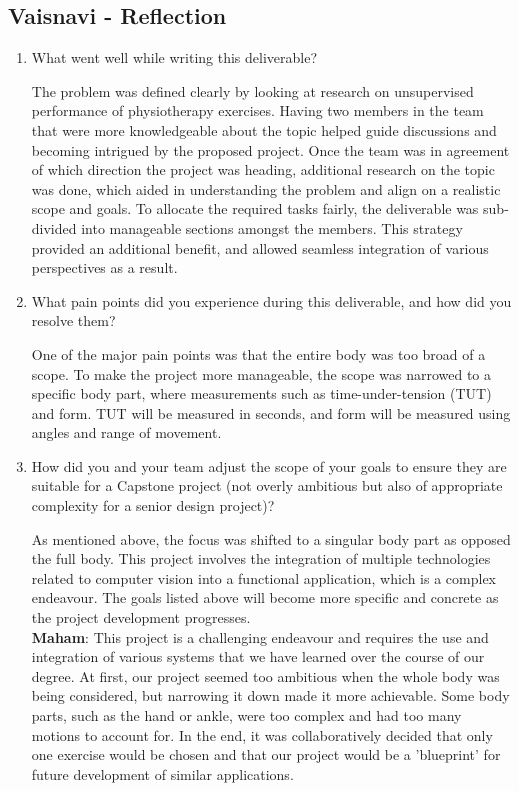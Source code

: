 \documentclass{article}
\begin{document}
\subsection*{Vaisnavi - Reflection}
\begin{enumerate}
    \item What went well while writing this deliverable? 

    The problem was defined clearly by looking at research on unsupervised performance of physiotherapy exercises. Having two members in the team that were more knowledgeable 
    about the topic helped guide discussions and becoming intrigued by the proposed project. Once the team was in agreement of which direction the project was heading, additional research on the topic was done, which aided in understanding the problem and align 
    on a realistic scope and goals. 
    To allocate the required tasks fairly, the deliverable was sub-divided into manageable sections amongst the members. This strategy provided an additional benefit, and allowed seamless integration of various perspectives as a result. 

    \item What pain points did you experience during this deliverable, and how
    did you resolve them?

    One of the major pain points was that the entire body was too broad of a scope. To make the project more manageable, the scope was narrowed to a specific body part, where measurements such as time-under-tension (TUT) and form. TUT will be measured in seconds, and form will be measured using angles and range of movement.

    \item How did you and your team adjust the scope of your goals to ensure
    they are suitable for a Capstone project (not overly ambitious but also of
    appropriate complexity for a senior design project)?
    
    As mentioned above, the focus was shifted to a singular body part as opposed the full body. This project involves the integration 
    of multiple technologies related to computer vision into a functional application, which is a complex endeavour. 
   The goals listed above will become more specific and concrete as the project development progresses. \\
   
   \textbf{Maham}: This project is a challenging endeavour and requires the use and integration of various systems that we have learned over the course of our degree. At first, our project seemed too ambitious when the whole body was being considered, but narrowing it down
   made it more achievable. Some body parts, such as the hand or ankle, were too complex and had too many motions to account for. In the end, it was collaboratively decided that only one exercise would be chosen and that our project would be a 'blueprint' for future development of similar applications. 
   
\end{enumerate}  
\end{document}
